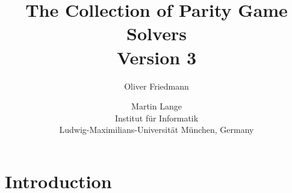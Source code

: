 \documentclass[open=left,twopage=true]{scrreprt}
\begin{document}
\begin{titlepage}
\subject{Report}
\title{The \pgsolver Collection of Parity Game Solvers \\[2mm] {\large Version 3}}
\author{Oliver Friedmann \and Martin Lange \\[3mm]
Institut f\"ur Informatik \\ Ludwig-Maximilians-Universit\"at M\"unchen, Germany}
\publishers{
\vspace{2cm}
\vspace{-2cm}}
\end{titlepage}
\maketitle[0]

\tableofcontents

\chapter{Introduction}


\end{document}
